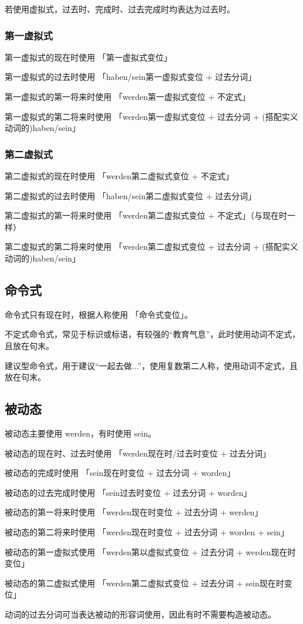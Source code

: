 若使用虚拟式，过去时、完成时、过去完成时均表达为过去时。

\subsubsection{第一虚拟式}


第一虚拟式的现在时使用 「第一虚拟式变位」

第一虚拟式的过去时使用 「haben/sein第一虚拟式变位 + 过去分词」

第一虚拟式的第一将来时使用 「werden第一虚拟式变位 + 不定式」

第一虚拟式的第二将来时使用 「werden第一虚拟式变位 + 过去分词 + (搭配实义动词的)haben/sein」

\subsubsection{第二虚拟式}

第二虚拟式的现在时使用 「werden第二虚拟式变位 + 不定式」

第二虚拟式的过去时使用 「haben/sein第二虚拟式变位 + 过去分词」

第二虚拟式的第一将来时使用 「werden第二虚拟式变位 + 不定式」（与现在时一样）

第二虚拟式的第二将来时使用 「werden第二虚拟式变位 + 过去分词 + (搭配实义动词的)haben/sein」

\subsection{命令式}

命令式只有现在时，根据人称使用 「命令式变位」。

不定式命令式，常见于标识或标语，有较强的“教育气息”，此时使用动词不定式，且放在句末。

建议型命令式，用于建议“一起去做...”，使用复数第二人称，使用动词不定式，且放在句末。

\subsection{被动态}

被动态主要使用 werden，有时使用 sein。

被动态的现在时、过去时使用 「werden现在时/过去时变位 + 过去分词」

被动态的完成时使用 「sein现在时变位 + 过去分词 + worden」

被动态的过去完成时使用 「sein过去时变位 + 过去分词 + worden」

被动态的第一将来时使用 「werden现在时变位 + 过去分词 + werden」

被动态的第二将来时使用 「werden现在时变位 + 过去分词 + worden + sein」

被动态的第一虚拟式使用 「werden第以虚拟式变位 + 过去分词 + werden现在时变位」

被动态的第二虚拟式使用 「werden第二虚拟式变位 + 过去分词 + sein现在时变位」

动词的过去分词可当表达被动的形容词使用，因此有时不需要构造被动态。




